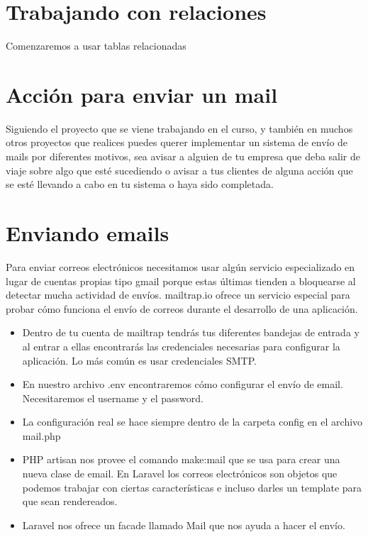\documentclass{article}
\begin{document}
\section{Trabajando con relaciones}%
Comenzaremos a usar tablas relacionadas


\section{Acción para enviar un mail}%
Siguiendo el proyecto que se viene trabajando en el curso, y también en muchos
otros proyectos que realices puedes querer implementar un sistema de envío de
mails por diferentes motivos, sea avisar a alguien de tu empresa que deba salir
de viaje sobre algo que esté sucediendo o avisar a tus clientes de alguna
acción que se esté llevando a cabo en tu sistema o haya sido completada.\\

\section{Enviando emails}%
Para enviar correos electrónicos necesitamos usar algún servicio especializado
en lugar de cuentas propias tipo gmail porque estas últimas tienden a
bloquearse al detectar mucha actividad de envíos. mailtrap.io ofrece un
servicio especial para probar cómo funciona el envío de correos durante el
desarrollo de una aplicación.\\

\begin{itemize}
  \item Dentro de tu cuenta de mailtrap tendrás tus diferentes bandejas de
    entrada y al entrar a ellas encontrarás las credenciales necesarias para
    configurar la aplicación. Lo más común es usar credenciales SMTP.
  \item En nuestro archivo .env encontraremos cómo configurar el envío de
    email. Necesitaremos el username y el password.
  \item La configuración real se hace siempre dentro de la carpeta config en el
    archivo mail.php
  \item PHP artisan nos provee el comando make:mail que se usa para crear una
    nueva clase de email. En Laravel los correos electrónicos son objetos que
    podemos trabajar con ciertas características e incluso darles un template
    para que sean rendereados.
  \item Laravel nos ofrece un facade llamado Mail que nos ayuda a hacer el
    envío.
\end{itemize}
\end{document}
